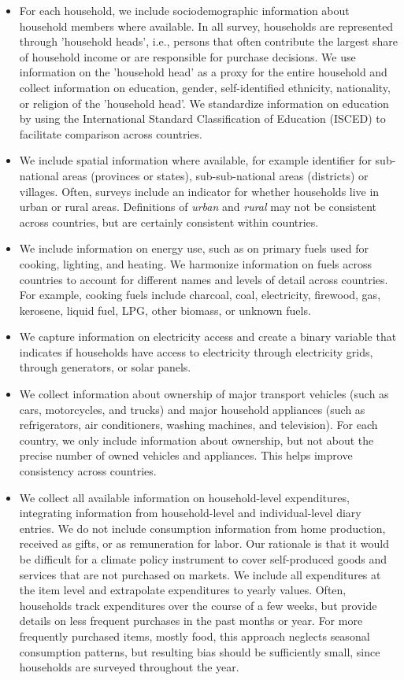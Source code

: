 \documentclass[12pt, a4paper]{article}
\begin{document}
\begin{refsection}
\begin{itemize}
    \item For each household, we include sociodemographic information about household members where available. In all survey, households are represented through 'household heads', i.e., persons that often contribute the largest share of household income or are responsible for purchase decisions. We use information on the 'household head' as a proxy for the entire household and collect information on education, gender, self-identified ethnicity, nationality, or religion of the 'household head'. We standardize information on education by using the International Standard Classification of Education (ISCED) to facilitate comparison across countries.
    \item We include spatial information where available, for example identifier for sub-national areas (provinces or states), sub-sub-national areas (districts) or villages. Often, surveys include an indicator for whether households live in urban or rural areas. Definitions of \textit{urban} and \textit{rural} may not be consistent across countries, but are certainly consistent within countries.
    \item We include information on energy use, such as on primary fuels used for cooking, lighting, and heating. We harmonize information on fuels across countries to account for different names and levels of detail across countries. For example, cooking fuels include charcoal, coal, electricity, firewood, gas, kerosene, liquid fuel, LPG, other biomass, or unknown fuels.
    \item We capture information on electricity access and create a binary variable that indicates if households have access to electricity through electricity grids, through generators, or solar panels. 
    \item We collect information about ownership of major transport vehicles (such as cars, motorcycles, and trucks) and major household appliances (such as refrigerators, air conditioners, washing machines, and television). For each country, we only include information about ownership, but not about the precise number of owned vehicles and appliances. This helps improve consistency across countries.
    \item We collect all available information on household-level expenditures, integrating information from household-level and individual-level diary entries. We do not include consumption information from home production, received as gifts, or as remuneration for labor. Our rationale is that it would be difficult for a climate policy instrument to cover self-produced goods and services that are not purchased on markets. We include all expenditures at the item level and extrapolate expenditures to yearly values. Often, households track expenditures over the course of a few weeks, but provide details on less frequent purchases in the past months or year. For more frequently purchased items, mostly food, this approach neglects seasonal consumption patterns, but resulting bias should be sufficiently small, since households are surveyed throughout the year.

\end{itemize}
\end{refsection}
\end{document}
